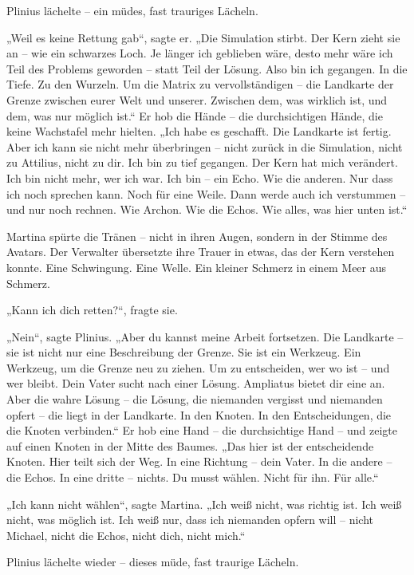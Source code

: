 \documentclass[
]{article}
\begin{document}
Plinius lächelte -- ein müdes, fast trauriges Lächeln.

„Weil es keine Rettung gab``, sagte er. „Die Simulation stirbt. Der Kern zieht sie an -- wie ein schwarzes Loch. Je länger ich geblieben wäre, desto mehr wäre ich Teil des Problems geworden -- statt Teil der Lösung. Also bin ich gegangen. In die Tiefe. Zu den Wurzeln. Um die Matrix zu vervollständigen -- die Landkarte der Grenze zwischen eurer Welt und unserer. Zwischen dem, was wirklich ist, und dem, was nur möglich ist.`` Er hob die Hände -- die durchsichtigen Hände, die keine Wachstafel mehr hielten. „Ich habe es geschafft. Die Landkarte ist fertig. Aber ich kann sie nicht mehr überbringen -- nicht zurück in die Simulation, nicht zu Attilius, nicht zu dir. Ich bin zu tief gegangen. Der Kern hat mich verändert. Ich bin nicht mehr, wer ich war. Ich bin -- ein Echo. Wie die anderen. Nur dass ich noch sprechen kann. Noch für eine Weile. Dann werde auch ich verstummen -- und nur noch rechnen. Wie Archon. Wie die Echos. Wie alles, was hier unten ist.``

Martina spürte die Tränen -- nicht in ihren Augen, sondern in der Stimme des Avatars. Der Verwalter übersetzte ihre Trauer in etwas, das der Kern verstehen konnte. Eine Schwingung. Eine Welle. Ein kleiner Schmerz in einem Meer aus Schmerz.

„Kann ich dich retten?{\kern0pt}``, fragte sie.

„Nein``, sagte Plinius. „Aber du kannst meine Arbeit fortsetzen. Die Landkarte -- sie ist nicht nur eine Beschreibung der Grenze. Sie ist ein Werkzeug. Ein Werkzeug, um die Grenze neu zu ziehen. Um zu entscheiden, wer wo ist -- und wer bleibt. Dein Vater sucht nach einer Lösung. Ampliatus bietet dir eine an. Aber die wahre Lösung -- die Lösung, die niemanden vergisst und niemanden opfert -- die liegt in der Landkarte. In den Knoten. In den Entscheidungen, die die Knoten verbinden.`` Er hob eine Hand -- die durchsichtige Hand -- und zeigte auf einen Knoten in der Mitte des Baumes. „Das hier ist der entscheidende Knoten. Hier teilt sich der Weg. In eine Richtung -- dein Vater. In die andere -- die Echos. In eine dritte -- nichts. Du musst wählen. Nicht für ihn. Für alle.``

„Ich kann nicht wählen``, sagte Martina. „Ich weiß nicht, was richtig ist. Ich weiß nicht, was möglich ist. Ich weiß nur, dass ich niemanden opfern will -- nicht Michael, nicht die Echos, nicht dich, nicht mich.``

Plinius lächelte wieder -- dieses müde, fast traurige Lächeln.
\end{document}
